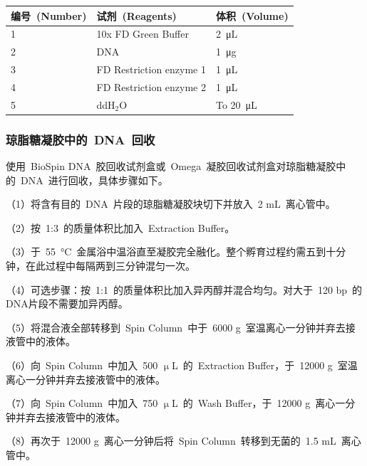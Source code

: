 \begin{table}[!ht]
\centering
{
\par}
\small
\begin{tabular*}{\textwidth}[c]{@{\extracolsep{\fill}}lll}
\toprule
编号\ (Number) & 试剂\ (Reagents) & 体积\ (Volume)\\
\midrule
1 & 10x FD Green Buffer & \SI{2}{\micro\liter}\\
2 & DNA & \SI{1}{\micro\gram}\\
3 & FD Restriction enzyme 1 & \SI{1}{\micro\liter}\\
4 & FD Restriction enzyme 2 & \SI{1}{\micro\liter}\\
5 & ddH$_2$O & To \SI{20}{\micro\liter}\\
\bottomrule
\end{tabular*}
\end{table}

\subsubsection{琼脂糖凝胶中的\ DNA\ 回收}\label{subsubsec:DNA}
使用\ BioSpin DNA\ 胶回收试剂盒或\ Omega\ 凝胶回收试剂盒对琼脂糖凝胶中的\ DNA\ 进行回收，具体步骤如下。

（1）将含有目的\ DNA\ 片段的琼脂糖凝胶块切下并放入\ 2 mL\ 离心管中。

（2）按\ 1:3\ 的质量体积比加入\ Extraction Buffer。

（3）于\ \SI{55}{\degreeCelsius}\ 金属浴中温浴直至凝胶完全融化。整个孵育过程约需五到十分钟，在此过程中每隔两到三分钟混匀一次。

（4）可选步骤：按\ 1:1\ 的质量体积比加入异丙醇并混合均匀。对大于\ 120 bp\ 的DNA片段不需要加异丙醇。

（5）将混合液全部转移到\ Spin Column\ 中于\ 6000 g\ 室温离心一分钟并弃去接液管中的液体。

（6）向\ Spin Column\ 中加入\ 500 $\upmu$L\ 的\ Extraction Buffer，于\ 12000 g\ 室温离心一分钟并弃去接液管中的液体。

（7）向\ Spin Column\ 中加入\ 750 $\upmu$L\ 的\ Wash Buffer，于\ 12000 g\ 离心一分钟并弃去接液管中的液体。

（8）再次于\ 12000 g\ 离心一分钟后将\ Spin Column\ 转移到无菌的\ 1.5 mL\ 离心管中。


